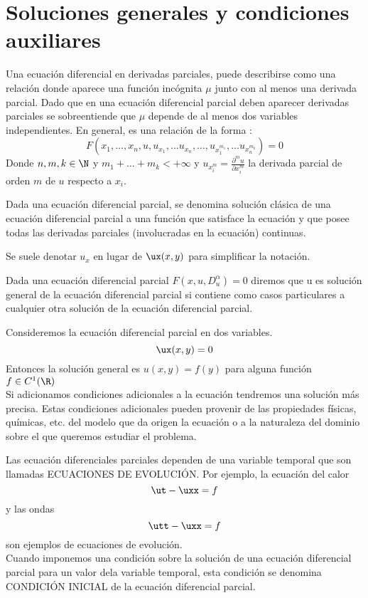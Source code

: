 \section{Soluciones generales y condiciones auxiliares}
\begin{Def}
    Una ecuación diferencial en derivadas parciales, puede describirse como una relación donde aparece una función incógnita $\mu$ junto con al menos una derivada parcial. Dado que en una ecuación diferencial parcial deben aparecer derivadas parciales se sobreentiende que $\mu$ depende de al menos dos variables independientes. En general, es una relación de la forma :
    $$F(x_1,\ldots,x_n, u, u_{x_1},\ldots u_{x_n},\ldots,u_{x^{m_1}_1},\ldots u_{x^{m_k}_n} )=0$$
    Donde $n,m,k \in\N$ y $m_1+\ldots+m_k<+\infty$ y $u_{x^{m}_i}=\frac{\partial^{m} u}{\partial x_i^m}$ la derivada parcial de orden $m$ de $u$ respecto a $x_i$.
\end{Def}
\begin{Def}
    Dada una ecuación diferencial parcial, se denomina solución clásica de una ecuación diferencial parcial a una función que satisface la ecuación y que posee todas las derivadas parciales (involucradas en la ecuación) continuas.
\end{Def}
\begin{Obs}
    Se suele denotar $u_x$ en lugar de $\ux(x,y)$ para simplificar la notación.
\end{Obs}
Dada una ecuación diferencial parcial $F(x,u,D^{\alpha}_u)=0$ diremos que u es solución general de la ecuación diferencial parcial si contiene como casos particulares a cualquier otra solución de la ecuación diferencial parcial.
\begin{Ejm}
    Consideremos la ecuación diferencial parcial en dos variables.
    $$\ux(x,y)=0$$
    Entonces la solución general es $u(x,y)=f(y)$ para alguna función $f\in C^1(\R)$\\
    Si adicionamos condiciones adicionales a la ecuación tendremos una solución más precisa. Estas condiciones adicionales pueden provenir de las propiedades físicas, químicas, etc. del modelo que da origen la ecuación o a la naturaleza del dominio sobre el que queremos estudiar el problema.
\end{Ejm}
Las ecuación diferenciales parciales dependen de una variable temporal que son llamadas ECUACIONES DE EVOLUCIÓN. Por ejemplo, la ecuación del calor  $$\ut-\uxx=f$$ y las ondas $$\utt-\uxx=f$$ son ejemplos de ecuaciones de evolución.\\Cuando imponemos una condición sobre la solución de una ecuación diferencial parcial para un valor dela variable temporal, esta condición se denomina CONDICIÓN INICIAL de la ecuación diferencial parcial.
